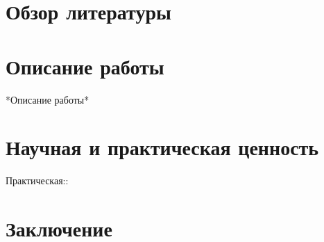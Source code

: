 \documentclass{article}
\begin{document}
\section{Обзор литературы}
\section{Описание работы}
*Описание работы*
\section{Научная и практическая ценность}
Практическая::
\section{Заключение}




\end{document}
